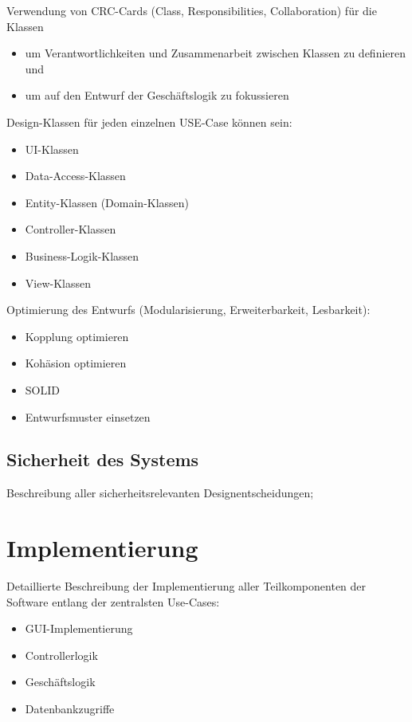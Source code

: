 Verwendung von CRC-Cards (Class, Responsibilities, Collaboration) für die Klassen
\begin{itemize}
	\item um Verantwortlichkeiten und Zusammenarbeit zwischen Klassen zu definieren und
	\item um auf den Entwurf der Geschäftslogik zu fokussieren
\end{itemize}

Design-Klassen für jeden einzelnen USE-Case können sein:
\begin{itemize}
	\item UI-Klassen
	\item Data-Access-Klassen
	\item Entity-Klassen (Domain-Klassen)
	\item Controller-Klassen
	\item Business-Logik-Klassen
	\item View-Klassen
\end{itemize}

Optimierung des Entwurfs (Modularisierung, Erweiterbarkeit, Lesbarkeit):
\begin{itemize}
	\item Kopplung optimieren
	\item 	Kohäsion optimieren
	\item 	SOLID
	\item 	Entwurfsmuster einsetzen
\end{itemize}

\section{Sicherheit des Systems}
Beschreibung aller sicherheitsrelevanten Designentscheidungen;

\chapter{Implementierung}
Detaillierte Beschreibung der Implementierung aller Teilkomponenten der Software entlang der zentralsten Use-Cases:

\begin{itemize}
	\item GUI-Implementierung
	\item Controllerlogik
	\item Geschäftslogik
	\item Datenbankzugriffe
\end{itemize}

